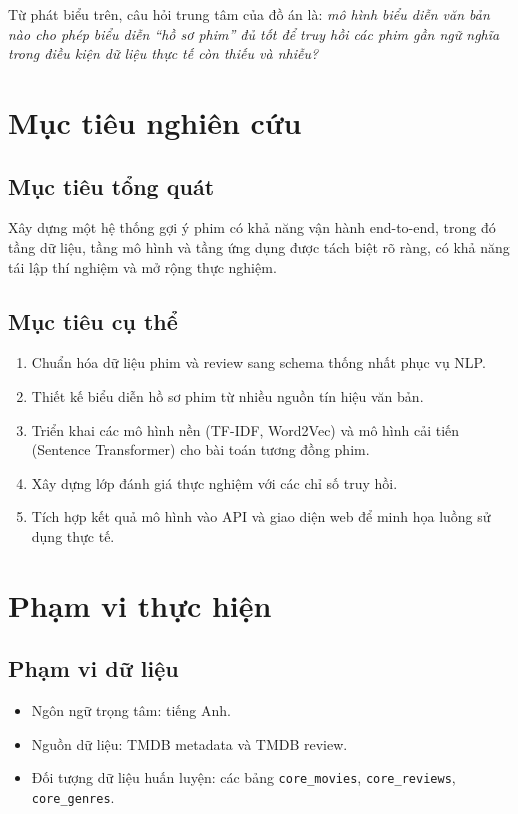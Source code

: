 Từ phát biểu trên, câu hỏi trung tâm của đồ án là: \textit{mô hình biểu diễn văn bản nào cho phép biểu diễn ``hồ sơ phim'' đủ tốt để truy hồi các phim gần ngữ nghĩa trong điều kiện dữ liệu thực tế còn thiếu và nhiễu?}

\section{Mục tiêu nghiên cứu}
\subsection{Mục tiêu tổng quát}
Xây dựng một hệ thống gợi ý phim có khả năng vận hành end-to-end, trong đó tầng dữ liệu, tầng mô hình và tầng ứng dụng được tách biệt rõ ràng, có khả năng tái lập thí nghiệm và mở rộng thực nghiệm.

\subsection{Mục tiêu cụ thể}
\begin{enumerate}[label=\arabic*.]
    \item Chuẩn hóa dữ liệu phim và review sang schema thống nhất phục vụ NLP.
    \item Thiết kế biểu diễn hồ sơ phim từ nhiều nguồn tín hiệu văn bản.
    \item Triển khai các mô hình nền (TF-IDF, Word2Vec) và mô hình cải tiến (Sentence Transformer) cho bài toán tương đồng phim.
    \item Xây dựng lớp đánh giá thực nghiệm với các chỉ số truy hồi.
    \item Tích hợp kết quả mô hình vào API và giao diện web để minh họa luồng sử dụng thực tế.
\end{enumerate}

\section{Phạm vi thực hiện}
\subsection{Phạm vi dữ liệu}
\begin{itemize}
    \item Ngôn ngữ trọng tâm: tiếng Anh.
    \item Nguồn dữ liệu: TMDB metadata và TMDB review.
    \item Đối tượng dữ liệu huấn luyện: các bảng \texttt{core\_movies}, \texttt{core\_reviews}, \texttt{core\_genres}.
\end{itemize}

